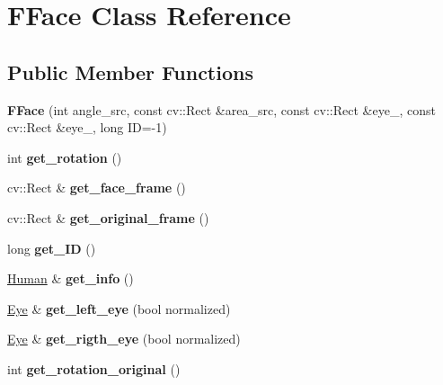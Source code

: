 \hypertarget{classFFace}{}\section{F\+Face Class Reference}
\label{classFFace}
\subsection*{Public Member Functions}
\begin{DoxyCompactItemize}
\item 
\mbox{\label{classFFace_a3fd9a4967475317f6992b8961ce3a70d}} 
{\bfseries F\+Face} (int angle\+\_\+src, const cv\+::\+Rect \&area\+\_\+src, const cv\+::\+Rect \&eye\+\_, const cv\+::\+Rect \&eye\+\_, long ID=-\/1)
\item 
\mbox{\label{classFFace_a515c08d3e3cc8e3609c549a9500938c4}} 
int {\bfseries get\+\_\+rotation} ()
\item 
\mbox{\label{classFFace_abcd3cc70544551afb7c5b44bf05d95ee}} 
cv\+::\+Rect \& {\bfseries get\+\_\+face\+\_\+frame} ()
\item 
\mbox{\label{classFFace_afc176ac9b30f25b4b18374a4a9f996ea}} 
cv\+::\+Rect \& {\bfseries get\+\_\+original\+\_\+frame} ()
\item 
\mbox{\label{classFFace_a3d4f56690379a92f24c2b944880b0659}} 
long {\bfseries get\+\_\+\+ID} ()
\item 
\mbox{\label{classFFace_a344778dae514f82c0f02776018a1718a}} 
\hyperlink{structHuman}{Human} \& {\bfseries get\+\_\+info} ()
\item 
\mbox{\label{classFFace_a6a8dd08854026cffaec7d830a25d79b1}} 
\hyperlink{structEye}{Eye} \& {\bfseries get\+\_\+left\+\_\+eye} (bool normalized)
\item 
\mbox{\label{classFFace_ab56c17cdfb69d1aba6d85a9c55d58296}} 
\hyperlink{structEye}{Eye} \& {\bfseries get\+\_\+rigth\+\_\+eye} (bool normalized)
\item 
\mbox{\label{classFFace_ac7b75ba2e441587ce65d08b4500b4f42}} 
int {\bfseries get\+\_\+rotation\+\_\+original} ()

\end{DoxyCompactItemize}
